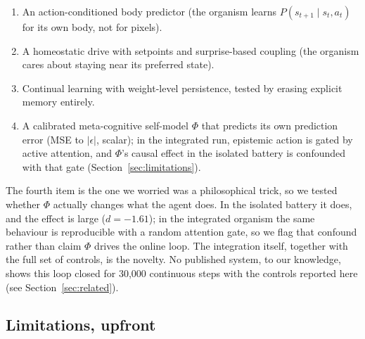 \documentclass[11pt,a4paper]{article}
\begin{document}
\begin{enumerate}[leftmargin=1.2em]
    \item An action-conditioned body predictor (the organism learns $P(s_{t+1} \mid s_t, a_t)$ for its own body, not for pixels).
    \item A homeostatic drive with setpoints and surprise-based coupling (the organism cares about staying near its preferred state).
    \item Continual learning with weight-level persistence, tested by erasing explicit memory entirely.
    \item A calibrated meta-cognitive self-model $\Phi$ that predicts its own prediction error (MSE to $|\epsilon|$, scalar); in the integrated run, epistemic action is gated by active attention, and $\Phi$'s causal effect in the isolated battery is confounded with that gate (Section~\ref{sec:limitations}).
\end{enumerate}

The fourth item is the one we worried was a philosophical trick, so we tested whether $\Phi$ actually changes what the agent does. In the isolated battery it does, and the effect is large ($d=-1.61$); in the integrated organism the same behaviour is reproducible with a random attention gate, so we flag that confound rather than claim $\Phi$ drives the online loop. The integration itself, together with the full set of controls, is the novelty. No published system, to our knowledge, shows this loop closed for 30,000 continuous steps with the controls reported here (see Section~\ref{sec:related}).

\subsection{Limitations, upfront}
\end{document}
